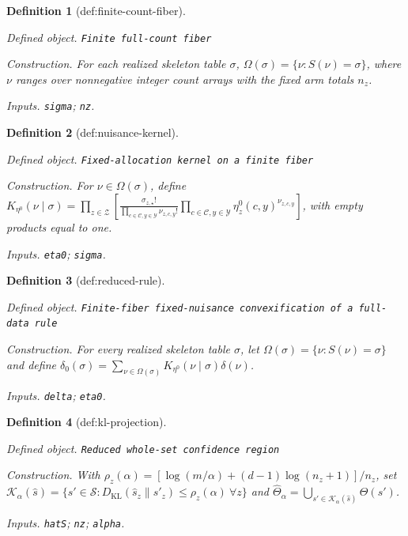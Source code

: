 \documentclass{article}
\newtheorem{definition}{Definition}
\begin{document}
\begin{definition}[def:finite-count-fiber]\label{def:finite-count-fiber}
\par\smallskip\noindent\emph{Defined object.} \texttt{Finite full-\allowbreak{}count fiber}
\par\smallskip\noindent\emph{Construction.} For each realized skeleton table \(\sigma\), \(\Omega(\sigma)=\{\nu:S(\nu)=\sigma\}\), where \(\nu\) ranges over nonnegative integer count arrays with the fixed arm totals \(n_z\).
\par\smallskip\noindent\emph{Inputs.} \texttt{sigma}; \texttt{nz}.
\end{definition}

\begin{definition}[def:nuisance-kernel]\label{def:nuisance-kernel}
\par\smallskip\noindent\emph{Defined object.} \texttt{Fixed-\allowbreak{}allocation kernel on a finite fiber}
\par\smallskip\noindent\emph{Construction.} For \(\nu\in\Omega(\sigma)\), define \(K_{\eta^0}(\nu\mid\sigma)=\prod_{z\in\mathcal Z}\left[\frac{\sigma_{z,\star}!}{\prod_{c\in\mathcal C,y\in\mathcal Y}\nu_{z,c,y}!}\prod_{c\in\mathcal C,y\in\mathcal Y}\eta^0_z(c,y)^{\nu_{z,c,y}}\right]\), with empty products equal to one.
\par\smallskip\noindent\emph{Inputs.} \texttt{eta0}; \texttt{sigma}.
\end{definition}

\begin{definition}[def:reduced-rule]\label{def:reduced-rule}
\par\smallskip\noindent\emph{Defined object.} \texttt{Finite-\allowbreak{}fiber fixed-\allowbreak{}nuisance convexification of a full-\allowbreak{}data rule}
\par\smallskip\noindent\emph{Construction.} For every realized skeleton table \(\sigma\), let \(\Omega(\sigma)=\{\nu:S(\nu)=\sigma\}\) and define \(\delta_0(\sigma)=\sum_{\nu\in\Omega(\sigma)}K_{\eta^0}(\nu\mid\sigma)\delta(\nu)\).
\par\smallskip\noindent\emph{Inputs.} \texttt{delta}; \texttt{eta0}.
\end{definition}

\begin{definition}[def:kl-projection]\label{def:kl-projection}
\par\smallskip\noindent\emph{Defined object.} \texttt{Reduced whole-\allowbreak{}set confidence region}
\par\smallskip\noindent\emph{Construction.} With \(\rho_z(\alpha)=[\log(m/\alpha)+(d-1)\log(n_z+1)]/n_z\), set \(\mathcal K_\alpha(\widehat s)=\{s'\in\mathcal S:D_{\mathrm{KL}}(\widehat s_z\|s'_z)\le\rho_z(\alpha)\ \forall z\}\) and \(\widehat\Theta_\alpha=\bigcup_{s'\in\mathcal K_\alpha(\widehat s)}\Theta(s')\).
\par\smallskip\noindent\emph{Inputs.} \texttt{hatS}; \texttt{nz}; \texttt{alpha}.
\end{definition}
\end{document}
